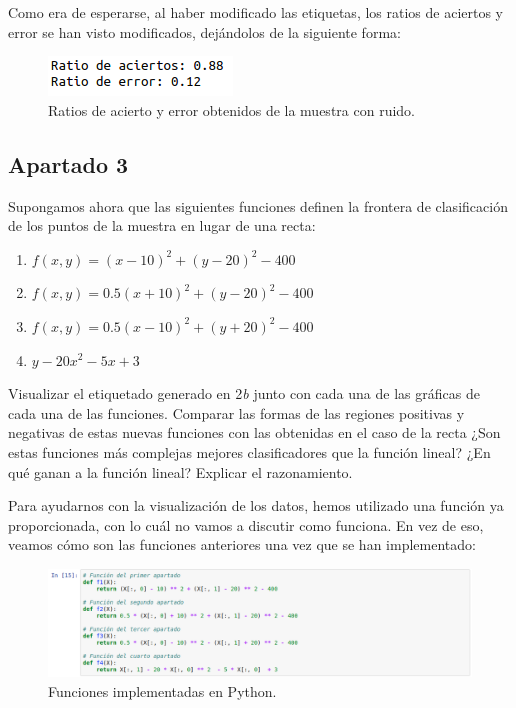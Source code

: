 \documentclass[11pt,a4paper]{article}
\begin{document}
Como era de esperarse, al haber modificado las etiquetas, los ratios de aciertos y error se han
visto modificados, dejándolos de la siguiente forma:

\begin{figure}[H]
\centering
\includegraphics[scale=0.7]{img/rates_noise.png}
\caption{Ratios de acierto y error obtenidos de la muestra con ruido.}
\end{figure}

\subsection*{Apartado 3}
\noindent Supongamos ahora que las siguientes funciones definen la frontera de clasificación
de los puntos de la muestra en lugar de una recta:

\begin{enumerate}
	\item \label{itm:f1} $f(x, y) = (x - 10)^2 + (y - 20)^2 - 400$
	\item \label{itm:f2} $f(x, y) = 0.5(x + 10)^2 + (y - 20)^2 - 400$
	\item \label{itm:f3} $f(x, y) = 0.5(x - 10)^2 + (y + 20)^2 - 400$
	\item \label{itm:f4} $y - 20x^2 - 5x + 3$
\end{enumerate}

\noindent Visualizar el etiquetado generado en 2\textit{b} junto con cada una de las gráficas de cada
una de las funciones. Comparar las formas de las regiones positivas y negativas de estas nuevas
funciones con las obtenidas en el caso de la recta ¿Son estas funciones más complejas
mejores clasificadores que la función lineal? ¿En qué ganan a la función lineal? Explicar el
razonamiento.

Para ayudarnos con la visualización de los datos, hemos utilizado una función ya proporcionada,
con lo cuál no vamos a discutir como funciona. En vez de eso, veamos cómo son las funciones 
anteriores una vez que se han implementado:

\begin{figure}[H]
\centering
\includegraphics[scale=0.4]{img/functions.png}
\caption{Funciones implementadas en Python.}
\end{figure}
\end{document}
